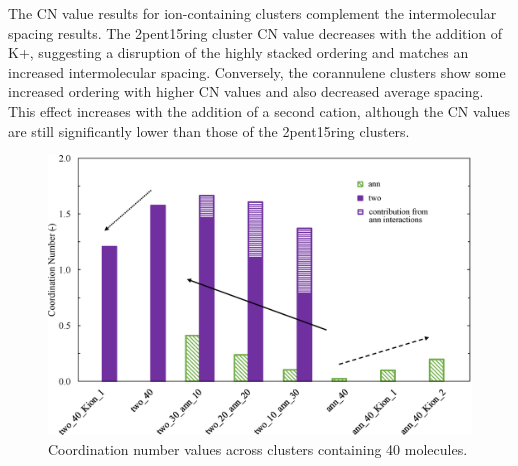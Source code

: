 The CN value results for ion-containing clusters complement the intermolecular spacing results. The 2pent15ring cluster CN value decreases with the addition of K+, suggesting a disruption of the highly stacked ordering and matches an increased intermolecular spacing. Conversely, the corannulene clusters show some increased ordering with higher CN values and also decreased average spacing. This effect increases with the addition of a second cation, although the CN values are still significantly lower than those of the 2pent15ring clusters.


\begin{figure}[!tbh]
\centering
\includegraphics[width=0.8\linewidth]{Figures/CN_bar_chart.eps}
\caption{Coordination number values across clusters containing 40 molecules.}
\label{fig:coordination_numbers}
\end{figure}
%




